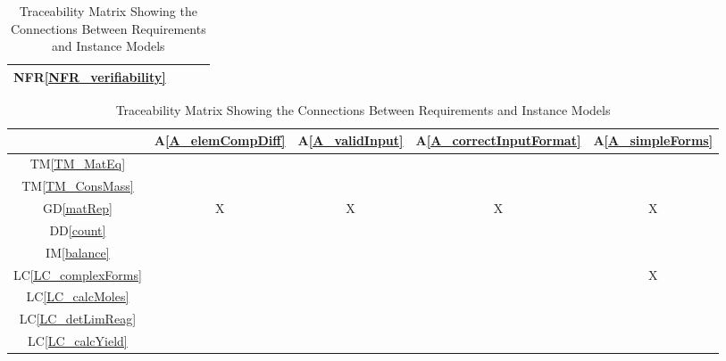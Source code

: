 \documentclass[12pt]{article}
\newcommand{\gdref}[1]{GD\ref{#1}}
\newcommand{\ddref}[1]{DD\ref{#1}}
\newcommand{\tmref}[1]{TM\ref{#1}}
\newcommand{\aref}[1]{A\ref{#1}}
\newcommand{\iref}[1]{IM\ref{#1}}
\newcommand{\nfrref}[1]{NFR\ref{#1}}
\newcommand{\lcref}[1]{LC\ref{#1}}
\begin{document}
\begin{table}[h!]
{\begin{tabular}{|c|c|c|c|}
      \nfrref{NFR_verifiability}     &                \\ \hline %
    \end{tabular}
    \caption{Traceability Matrix Showing the Connections Between Requirements and Instance Models}
    \label{Table:R_trace}
  }
  \hfill
  \parbox{.45\linewidth}{
    \centering
    \begin{tabular}{|c|c|c|c|c|}
      \hline
                                      & \aref{A_elemCompDiff} & \aref{A_validInput} & \aref{A_correctInputFormat} & \aref{A_simpleForms} \\
      \hline
      \tmref{TM_MatEq}                &                       &                     &                             &                      \\ \hline
      \tmref{TM_ConsMass}             &                       &                     &                             &                      \\ \hline
      \gdref{matRep}                  & X                     & X                   & X                           & X                    \\ \hline
      \ddref{count}                   &                       &                     &                             &                      \\ \hline
      \iref{balance}                  &                       &                     &                             &                      \\ \hline
      \lcref{LC_complexForms}         &                       &                     &                             & X                    \\ \hline
      \lcref{LC_calcMoles}            &                       &                     &                             &                      \\ \hline
      \lcref{LC_detLimReag}           &                       &                     &                             &                      \\ \hline
      \lcref{LC_calcYield}            &                       &                     &                             &                      \\ \hline

\end{tabular}}
\end{table}
\end{document}
